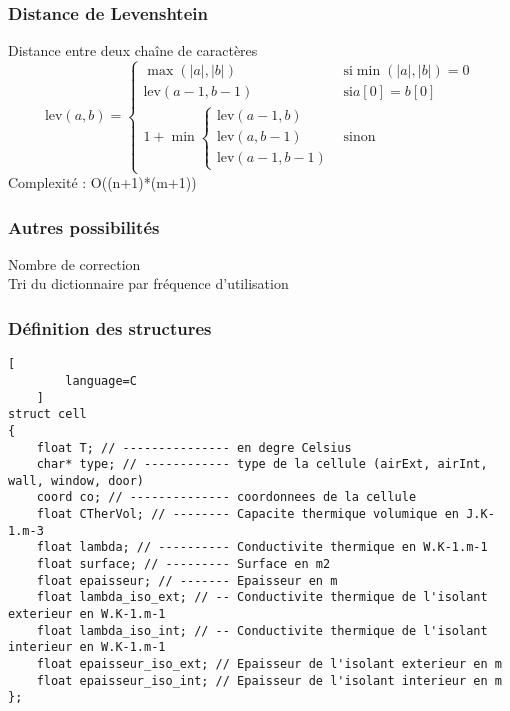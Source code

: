 \documentclass{beamer}
\renewcommand{\t}{\text}
\begin{document}
\begin{frame}
   \frametitle{Distance de Levenshtein}
   Distance entre deux chaîne de caractères
   $$
   \t{lev}(a,b) = \begin{cases} \max(|a|,|b|) & \t{si} \min(|a|,|b|) = 0 \\
                                \t{lev}(a-1, b-1) & \t{si} a[0] = b[0] \\
                                1 + \min \begin{cases} \t{lev}(a-1,b) \\ \t{lev}(a, b-1) \\ \t{lev}(a-1, b-1) \end{cases} & \t{sinon}
                  \end{cases}
   $$
   Complexité : O((n+1)*(m+1))
\end{frame}

\begin{frame}
   \frametitle{Autres possibilités}
   Nombre de correction\\
   Tri du dictionnaire par fréquence d'utilisation\\
\end{frame}

\begin{frame}[fragile]
    \frametitle{Définition des structures}

    \begin{lstlisting}[
        language=C
    ]
struct cell
{
    float T; // --------------- en degre Celsius
    char* type; // ------------ type de la cellule (airExt, airInt, wall, window, door)
    coord co; // -------------- coordonnees de la cellule
    float CTherVol; // -------- Capacite thermique volumique en J.K-1.m-3
    float lambda; // ---------- Conductivite thermique en W.K-1.m-1
    float surface; // --------- Surface en m2
    float epaisseur; // ------- Epaisseur en m
    float lambda_iso_ext; // -- Conductivite thermique de l'isolant exterieur en W.K-1.m-1
    float lambda_iso_int; // -- Conductivite thermique de l'isolant interieur en W.K-1.m-1
    float epaisseur_iso_ext; // Epaisseur de l'isolant exterieur en m
    float epaisseur_iso_int; // Epaisseur de l'isolant interieur en m
};
    \end{lstlisting}

\end{frame}
\end{document}
